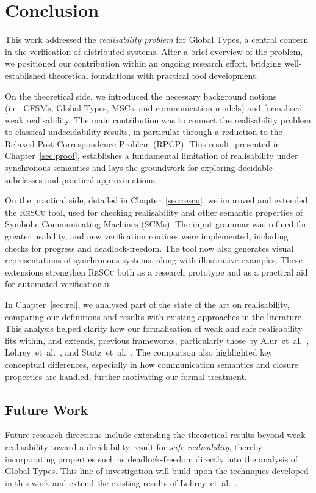 \chapter{Conclusion}\label{sec:end}
This work addressed the \emph{realisability problem} for Global 
Types, a central concern in the verification of distributed systems. 
After a brief overview of the problem, we positioned our contribution 
within an ongoing research effort, bridging well-established 
theoretical foundations with practical tool development.  

On the theoretical side, we introduced the necessary background 
notions (i.e.\ CFSMs, Global Types, MSCs, and communication models) and 
formalised weak realisability. The main contribution was to connect 
the realisability problem to classical undecidability results, in 
particular through a reduction to the Relaxed Post Correspondence 
Problem (RPCP). This result, presented in 
Chapter~\ref{sec:proof}, establishes a fundamental limitation 
of realisability under synchronous semantics and lays the groundwork 
for exploring decidable subclasses and practical approximations.

On the practical side, detailed in Chapter~\ref{sec:rescu}, we improved 
and extended the \textsc{ReSCu} tool, used for checking realisability 
and other semantic properties of Symbolic Communicating Machines 
(SCMs). The input grammar was refined for greater usability, and new 
verification routines were implemented, including checks for progress 
and deadlock-freedom. The tool now also generates visual 
representations of synchronous systems, along with illustrative 
examples. These extensions strengthen \textsc{ReSCu} both as a research 
prototype and as a practical aid for automated verification.ù

In Chapter~\ref{sec:rel}, we analysed part of the state of the art on 
realisability, comparing our definitions and results with existing 
approaches in the literature. This analysis helped clarify how our 
formalisation of weak and safe realisability fits within, and extends, 
previous frameworks, particularly those by 
Alur~et~al.~\cite{alur2005realizability}, 
Lohrey~et~al.~\cite{lohrey2003realizability}, and 
Stutz~et~al.~\cite{stutz2024implementability}. The comparison also 
highlighted key conceptual differences, especially in how communication 
semantics and closure properties are handled, further motivating our 
formal treatment.

\section{Future Work}
Future research directions include extending the theoretical results
beyond weak realisability toward a decidability result for
\emph{safe realisability}, thereby incorporating properties such as
deadlock-freedom directly into the analysis of Global Types. This line
of investigation will build upon the techniques developed in this work
and extend the existing results of Lohrey~et~al.~\cite{lohrey2003realizability}.  

